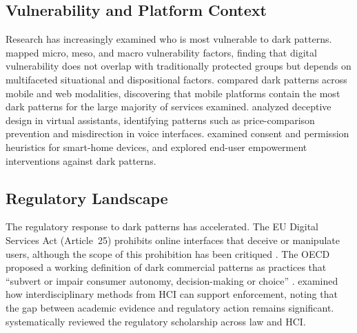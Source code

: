 \documentclass[a4paper]{article}
\begin{document}
\subsection{Vulnerability and Platform Context}
Research has increasingly examined who is most vulnerable to dark patterns. \citet{rossi2024} mapped micro, meso, and macro vulnerability factors, finding that digital vulnerability does not overlap with traditionally protected groups but depends on multifaceted situational and dispositional factors. \citet{gunawan2021} compared dark patterns across mobile and web modalities, discovering that mobile platforms contain the most dark patterns for the large majority of services examined. \citet{deconca2023} analyzed deceptive design in virtual assistants, identifying patterns such as price-comparison prevention and misdirection in voice interfaces. \citet{chalhoub2024} examined consent and permission heuristics for smart-home devices, and \citet{lu2024} explored end-user empowerment interventions against dark patterns.

\subsection{Regulatory Landscape}
The regulatory response to dark patterns has accelerated. The EU Digital Services Act (Article~25) prohibits online interfaces that deceive or manipulate users, although the scope of this prohibition has been critiqued \citep{isola2025}. The OECD proposed a working definition of dark commercial patterns as practices that ``subvert or impair consumer autonomy, decision-making or choice'' \citep{oecd2022}. \citet{gunawan2025} examined how interdisciplinary methods from HCI can support enforcement, noting that the gap between academic evidence and regulatory action remains significant. \citet{yi2025} systematically reviewed the regulatory scholarship across law and HCI.
\end{document}
